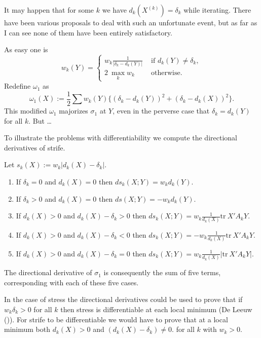 \documentclass[
  12pt,
  letterpaper,
  DIV=11,
  numbers=noendperiod]{scrartcl}
\providecommand{\tightlist}{%
  \setlength{\itemsep}{0pt}\setlength{\parskip}{0pt}}\usepackage{longtable,booktabs,array}
\begin{document}
It may happen that for some \(k\) we have \(d_k(X^{(k)})=\delta_k\)
while iterating. There have been various proposals to deal with such an
unfortunate event, but as far as I can see none of them have been
entirely satisfactory.

As easy one is \begin{equation}
w_k(Y)=\begin{cases}
w_k\frac{1}{|\delta_k-d_k(Y)|}&\text{ if }d_k(Y)\not =\delta_k,\\
2\ \max_k w_k&\text{ otherwise}.\label{eq:sdef}
\end{cases}
\end{equation} Redefine \(\omega_1\) as \begin{equation}
\omega_1(X):=\frac12\sum w_k(Y)\{(\delta_k-d_k(Y))^2+(\delta_k-d_k(X))^2\}.\label{eq:ommaj}
\end{equation} This modified \(\omega_1\) majorizes \(\sigma_1\) at
\(Y\), even in the perverse case that \(\delta_k=d_k(Y)\) for all \(k\).
But \ldots{}

To illustrate the problems with differentiability we compute the
directional derivatives of strife.

Let \(s_k(X):=w_k|d_k(X)-\delta_k|\).

\begin{enumerate}
\def\labelenumi{\arabic{enumi}.}
\tightlist
\item
  If \(\delta_k=0\) and \(d_k(X)=0\) then \(ds_k(X;Y)=w_kd_k(Y)\).
\item
  If \(\delta_k>0\) and \(d_k(X)=0\) then \(ds(X;Y)=-w_kd_k(Y)\).
\item
  If \(d_k(X)>0\) and \(d_k(X)-\delta_k>0\) then
  \(ds_k(X;Y)=w_k\frac{1}{d_k(X)}\text{tr}\ X'A_kY\).
\item
  If \(d_k(X)>0\) and \(d_k(X)-\delta_k<0\) then
  \(ds_k(X;Y)=-w_k\frac{1}{d_k(X)}\text{tr}\ X'A_kY\).
\item
  If \(d_k(X)>0\) and \(d_k(X)-\delta_k=0\) then
  \(ds_k(X;Y)=w_k\frac{1}{d_k(X)}|\text{tr}\ X'A_kY|\).
\end{enumerate}

The directional derivative of \(\sigma_1\) is consequently the sum of
five terms, corresponding with each of these five cases.

In the case of stress the directional derivatives could be used to prove
that if \(w_k\delta_k>0\) for all \(k\) then stress is differentiable at
each local minimum (De Leeuw ()). For
strife to be differentiable we would have to prove that at a local
minimum both \(d_k(X)>0\) and \((d_k(X)-\delta_k)\not= 0\). for all
\(k\) with \(w_k>0\).
\end{document}
